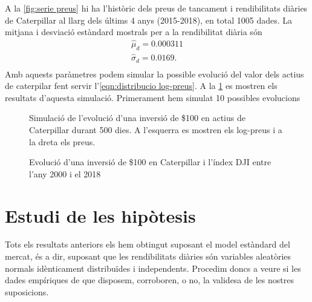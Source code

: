 \documentclass{article}
\numberwithin{table}{section}
\numberwithin{figure}{section}
\numberwithin{equation}{section}
\begin{document}
A la \cref{fig:serie preus} hi ha l'històric dels preus de tancament i rendibilitats diàries de Caterpillar al llarg dels últims 4 anys (2015-2018), en total 1005 dades. La mitjana i desviació estàndard mostrals per a la rendibilitat diària són
\begin{equation} \label{eq:parametres}
	\begin{gathered}
		\hat{\mu}_d = 0.000311 \\
		\hat{\sigma}_d	= 0.0169. \\
	\end{gathered}
\end{equation}
Amb aquests paràmetres podem simular la possible evolució del valor dels actius de caterpilar fent servir l'\cref{eqn:distribucio log-preus}. A la \cref{fig:simulacio} es mostren els resultats d'aquesta simulació. Primerament hem simulat 10 possibles evolucions 

\begin{figure}[htb]
	\centering \sffamily \small
	
	\caption{Simulació de l'evolució d'una inversió de \$100 en actius de Caterpillar durant 500 dies. A l'esquerra es mostren els log-preus i a la dreta els preus.}
	\label{fig:simulacio}
\end{figure}

\begin{figure}[H]
	\centering \sffamily \small
	
	\caption{Evolució d'una inversió de \$100 en Caterpillar i l'índex DJI entre l'any 2000 i el 2018}
	\label{fig:inversio}
\end{figure}
\newpage

\section{Estudi de les hipòtesis}
Tots els resultats anteriors els hem obtingut suposant el model estàndard del mercat, és a dir, suposant que les rendibilitats diàries són variables aleatòries normals idènticament distribuïdes i independents. Procedim doncs a veure si les dades empíriques de que disposem, corroboren, o no, la validesa de les nostres suposicions.
\end{document}
